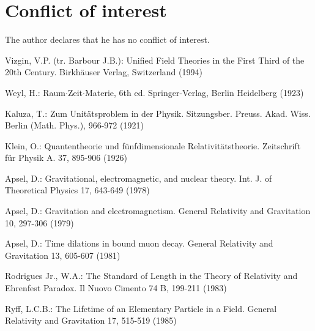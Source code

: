 \section*{Conflict of interest}

The author declares that he has no conflict of interest.



\begin{thebibliography}{}

Vizgin, V.P. (tr. Barbour J.B.):
Unified Field Theories in the First Third of the 20th Century.
Birkh\"{a}user Verlag, Switzerland (1994)

Weyl, H.:
Raum$\cdot$Zeit$\cdot$Materie, 6th ed.
Springer-Verlag, Berlin Heidelberg (1923)


Kaluza, T.:
Zum Unit\"{a}tsproblem in der Physik.
Sitzungsber. Preuss. Akad. Wiss. Berlin (Math. Phys.), 966-972 (1921)
 
Klein, O.:
Quantentheorie und f\"{u}nfdimensionale Relativit\"{a}tstheorie.
Zeitschrift f\"{u}r Physik A. 37, 895-906 (1926)

Apsel, D.:
Gravitational, electromagnetic, and nuclear theory.
Int. J.  of Theoretical Physics 17, 643-649 (1978)

Apsel, D.:
Gravitation and electromagnetism.
General Relativity and Gravitation 10, 297-306 (1979)

Apsel, D.:
Time dilations in bound muon decay.
General Relativity and Gravitation 13, 605-607 (1981)

Rodrigues Jr., W.A.:
The Standard of Length in the Theory of Relativity and Ehrenfest Paradox.
Il Nuovo Cimento 74 B, 199-211 (1983)

Ryff, L.C.B.:
The Lifetime of an Elementary Particle in a Field.
General Relativity and Gravitation 17, 515-519 (1985)


\end{thebibliography}
